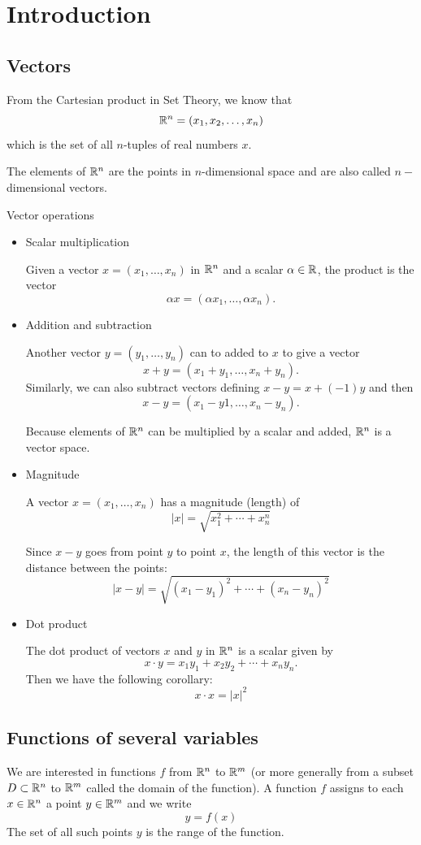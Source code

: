 \section{Introduction}
\subsection{Vectors}
From the Cartesian product in Set Theory, we know that
\[ \mathbb R^n = (x_1, x_2, \dots, x_n) \]
which is the set of all $n$-tuples of real numbers $x$.

The elements of $\mathbb R^n$ are the points in $n$-dimensional space and are also called $n-$dimensional vectors.

Vector operations
\begin{itemize}
\item Scalar multiplication

Given a vector $x = (x_1, \dots, x_n)$ in $\mathbb R^n$ and a scalar $\alpha \in \mathbb R$, the product is the vector 
\[ \alpha x = (\alpha x_1, \dots, \alpha x_n). \]

\item Addition and subtraction

Another vector $y = (y_1, \dots, y_n)$ can to added to $x$ to give a vector
\[ x+y = (x_1+y_1, \dots, x_n+y_n). \]
Similarly, we can also subtract vectors defining $x-y=x+(-1)y$ and then
\[ x-y = (x_1-y1, \dots, x_n-y_n). \]

\begin{remark}
Because elements of $\mathbb R^n$ can be multiplied by a scalar and added, $\mathbb R^n$ is a vector space.
\end{remark}

\item Magnitude

A vector $x = (x_1, \dots, x_n)$ has a magnitude (length) of
\[ |x| = \sqrt{x_1^2+\cdots+x_n^n} \]

Since $x-y$ goes from point $y$ to point $x$, the length of this vector is the distance between the points:
\[ |x-y| = \sqrt{(x_1-y_1)^2+\cdots+(x_n-y_n)^2} \]

\item Dot product

The dot product of vectors $x$ and $y$ in $\mathbb R^n$ is a scalar given by
\[ x \cdot y = x_1y_1 + x_2y_2 + \cdots + x_ny_n. \]
Then we have the following corollary:
\[ x \cdot x = |x|^2 \]

\end{itemize}

\subsection{Functions of several variables}
We are interested in functions $f$ from $\mathbb R^n$ to $\mathbb R^m$ (or more generally from a subset $D \subset \mathbb R^n$ to $\mathbb R^m$ called the domain of the function). A function $f$ assigns to each $x \in \mathbb R^n$ a point $y \in \mathbb R^m$ and we write
\[ y=f(x) \]
The set of all such points $y$ is the range of the function.

